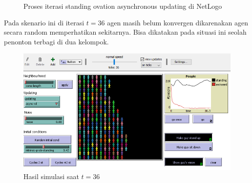 \begin{figure}[H]
	\centering
	\hfill
	\hfill
	\hfill
	\caption{Proses iterasi standing ovation asynchronous updating di NetLogo}
	\label{fig:proses_sop_async}
\end{figure}

Pada skenario ini di iterasi $t=36$ agen masih belum konvergen dikarenakan agen secara random memperhatikan sekitarnya. Bisa dikatakan pada situasi ini seolah penonton terbagi di dua kelompok.

\begin{figure}[H]
\centering
\includegraphics[width=\linewidth]{images/ch03/sop8}
\caption{Hasil simulasi saat $t=36$}
\label{fig:sop8}
\end{figure}

